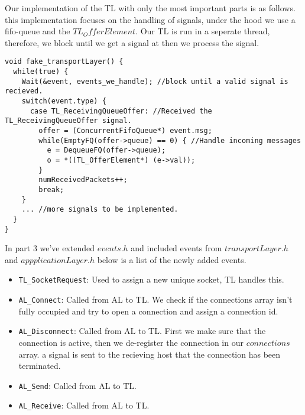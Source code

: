 Our implementation of the TL with only the most important parts is as follows.
this implementation focuses on the handling of signals, under the hood we use a fifo-queue and the $TL_OfferElement$.
Our TL is run in a seperate thread, therefore, we block until we get a signal at then we process the signal.
\begin{lstlisting}
void fake_transportLayer() {
  while(true) {
    Wait(&event, events_we_handle); //block until a valid signal is recieved.
    switch(event.type) {
      case TL_ReceivingQueueOffer: //Received the TL_ReceivingQueueOffer signal.
        offer = (ConcurrentFifoQueue*) event.msg;
        while(EmptyFQ(offer->queue) == 0) { //Handle incoming messages
          e = DequeueFQ(offer->queue);
          o = *((TL_OfferElement*) (e->val));
        }
        numReceivedPackets++;
        break;
    }
    ... //more signals to be implemented.
  }
}
\end{lstlisting}

In part 3 we've extended $events.h$ and included events from $transportLayer.h$ and $appplicationLayer.h$
below is a list of the newly added events.
\begin{itemize}
\item \texttt{TL\_SocketRequest}: Used to assign a new unique socket, TL handles this.

\item \texttt{AL\_Connect}: Called from AL to TL.
We check if the connections array isn't fully occupied and try to open a connection and assign a connection id.

\item \texttt{AL\_Disconnect}: Called from AL to TL. First we make sure that the connection is active, then we de-register the connection in our $connections$ array.
a signal is sent to the recieving host that the connection has been terminated.

\item \texttt{AL\_Send}: Called from AL to TL.

\item \texttt{AL\_Receive}: Called from AL to TL.

\end{itemize}

